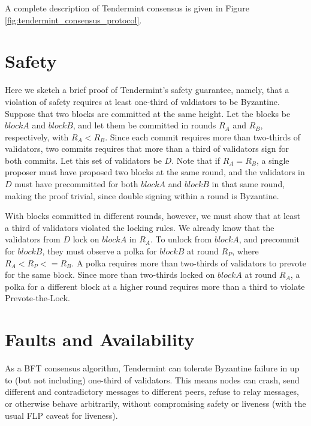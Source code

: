 A complete description of Tendermint consensus is given in Figure \ref{fig:tendermint_consensus_protocol}.

\section{Safety}

Here we sketch a brief proof of Tendermint's safety guarantee, namely, 
that a violation of safety requires at least one-third of valdiators to be Byzantine.
Suppose that two blocks are committed at the same height.
Let the blocks be $blockA$ and $blockB$, and let them be committed in rounds $R_A$ and $R_B$, respectively, with $R_A < R_B$.
Since each commit requires more than two-thirds of validators, 
two commits requires that more than a third of validators sign for both commits.
Let this set of validators be $D$.
Note that if $R_A = R_B$, a single proposer must have proposed two blocks at the same round, 
and the validators in $D$ must have precommitted for both $blockA$ and $blockB$ in that same round, 
making the proof trivial, since double signing within a round is Byzantine.

With blocks committed in different rounds, however, 
we must show that at least a third of validators violated the locking rules.
We already know that the validators from $D$ lock on $blockA$ in $R_A$.
To unlock from $blockA$, and precommit for $blockB$, 
they must observe a polka for $blockB$ at round $R_P$, where $R_A < R_P <= R_B$.
A polka requires more than two-thirds of validators to prevote for the same block.
Since more than two-thirds locked on $blockA$ at round $R_A$, 
a polka for a different block at a higher round requires more than a third to violate Prevote-the-Lock.

%
%
%


\section{Faults and Availability}

As a BFT consensus algorithm, Tendermint can tolerate Byzantine failure in up to (but not including) one-third of validators.
This means nodes can crash, send different and contradictory messages to different peers, refuse to relay messages, or otherwise behave arbitrarily,
without compromising safety or liveness (with the usual FLP caveat for liveness).

